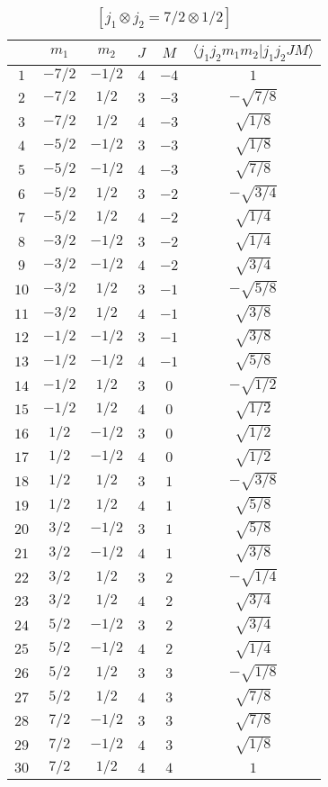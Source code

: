 \begin{table}
\tiny
\caption{$[j_1 \otimes j_2 = 7/2 \otimes 1/2]$}
\begin{center}
\begin{tabular}{|c|c|c|c|c|c|}
\hline 
   & $m_1$ & $m_2$ & $J$ & $M$ & $\langle j_1 j_2 m_1 m_2 | j_1 j_2 J M \rangle$ \\ 
\hline 
$1$ & $-7/2$ & $-1/2$ & $4$ & $-4$ & $1$ \\ 
$2$ & $-7/2$ & $1/2$ & $3$ & $-3$ & $-\sqrt{7/8}$ \\ 
$3$ & $-7/2$ & $1/2$ & $4$ & $-3$ & $\sqrt{1/8}$ \\ 
$4$ & $-5/2$ & $-1/2$ & $3$ & $-3$ & $\sqrt{1/8}$ \\ 
$5$ & $-5/2$ & $-1/2$ & $4$ & $-3$ & $\sqrt{7/8}$ \\ 
$6$ & $-5/2$ & $1/2$ & $3$ & $-2$ & $-\sqrt{3/4}$ \\ 
$7$ & $-5/2$ & $1/2$ & $4$ & $-2$ & $\sqrt{1/4}$ \\ 
$8$ & $-3/2$ & $-1/2$ & $3$ & $-2$ & $\sqrt{1/4}$ \\ 
$9$ & $-3/2$ & $-1/2$ & $4$ & $-2$ & $\sqrt{3/4}$ \\ 
$10$ & $-3/2$ & $1/2$ & $3$ & $-1$ & $-\sqrt{5/8}$ \\ 
$11$ & $-3/2$ & $1/2$ & $4$ & $-1$ & $\sqrt{3/8}$ \\ 
$12$ & $-1/2$ & $-1/2$ & $3$ & $-1$ & $\sqrt{3/8}$ \\ 
$13$ & $-1/2$ & $-1/2$ & $4$ & $-1$ & $\sqrt{5/8}$ \\ 
$14$ & $-1/2$ & $1/2$ & $3$ & $0$ & $-\sqrt{1/2}$ \\ 
$15$ & $-1/2$ & $1/2$ & $4$ & $0$ & $\sqrt{1/2}$ \\ 
$16$ & $1/2$ & $-1/2$ & $3$ & $0$ & $\sqrt{1/2}$ \\ 
$17$ & $1/2$ & $-1/2$ & $4$ & $0$ & $\sqrt{1/2}$ \\ 
$18$ & $1/2$ & $1/2$ & $3$ & $1$ & $-\sqrt{3/8}$ \\ 
$19$ & $1/2$ & $1/2$ & $4$ & $1$ & $\sqrt{5/8}$ \\ 
$20$ & $3/2$ & $-1/2$ & $3$ & $1$ & $\sqrt{5/8}$ \\ 
$21$ & $3/2$ & $-1/2$ & $4$ & $1$ & $\sqrt{3/8}$ \\ 
$22$ & $3/2$ & $1/2$ & $3$ & $2$ & $-\sqrt{1/4}$ \\ 
$23$ & $3/2$ & $1/2$ & $4$ & $2$ & $\sqrt{3/4}$ \\ 
$24$ & $5/2$ & $-1/2$ & $3$ & $2$ & $\sqrt{3/4}$ \\ 
$25$ & $5/2$ & $-1/2$ & $4$ & $2$ & $\sqrt{1/4}$ \\ 
$26$ & $5/2$ & $1/2$ & $3$ & $3$ & $-\sqrt{1/8}$ \\ 
$27$ & $5/2$ & $1/2$ & $4$ & $3$ & $\sqrt{7/8}$ \\ 
$28$ & $7/2$ & $-1/2$ & $3$ & $3$ & $\sqrt{7/8}$ \\ 
$29$ & $7/2$ & $-1/2$ & $4$ & $3$ & $\sqrt{1/8}$ \\ 
$30$ & $7/2$ & $1/2$ & $4$ & $4$ & $1$ \\ 
\hline 
\end{tabular}
\end{center}
\end{table}

